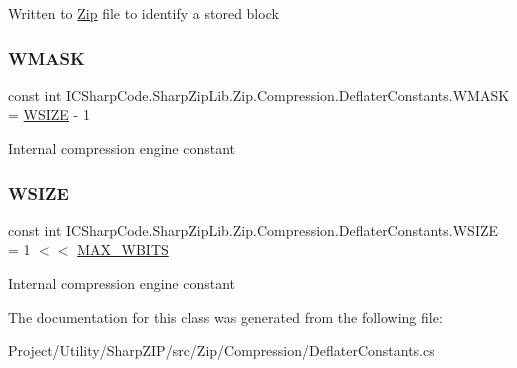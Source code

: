 Written to \hyperlink{namespace_i_c_sharp_code_1_1_sharp_zip_lib_1_1_zip}{Zip} file to identify a stored block 

\mbox{\label{class_i_c_sharp_code_1_1_sharp_zip_lib_1_1_zip_1_1_compression_1_1_deflater_constants_a5fb96961b739d7f56fe8809c760c1587}} 
\subsubsection{\texorpdfstring{W\+M\+A\+SK}{WMASK}}
{\footnotesize\ttfamily const int I\+C\+Sharp\+Code.\+Sharp\+Zip\+Lib.\+Zip.\+Compression.\+Deflater\+Constants.\+W\+M\+A\+SK = \hyperlink{class_i_c_sharp_code_1_1_sharp_zip_lib_1_1_zip_1_1_compression_1_1_deflater_constants_a3e1ad9d347115b6c72aefea84127174d}{W\+S\+I\+ZE} -\/ 1}



Internal compression engine constant 

\mbox{\label{class_i_c_sharp_code_1_1_sharp_zip_lib_1_1_zip_1_1_compression_1_1_deflater_constants_a3e1ad9d347115b6c72aefea84127174d}} 
\subsubsection{\texorpdfstring{W\+S\+I\+ZE}{WSIZE}}
{\footnotesize\ttfamily const int I\+C\+Sharp\+Code.\+Sharp\+Zip\+Lib.\+Zip.\+Compression.\+Deflater\+Constants.\+W\+S\+I\+ZE = 1 $<$$<$ \hyperlink{class_i_c_sharp_code_1_1_sharp_zip_lib_1_1_zip_1_1_compression_1_1_deflater_constants_a1514f696217dc6427749197bc3aab5b1}{M\+A\+X\+\_\+\+W\+B\+I\+TS}}



Internal compression engine constant 



The documentation for this class was generated from the following file\+:\begin{DoxyCompactItemize}
\item 
Project/\+Utility/\+Sharp\+Z\+I\+P/src/\+Zip/\+Compression/Deflater\+Constants.\+cs\end{DoxyCompactItemize}
